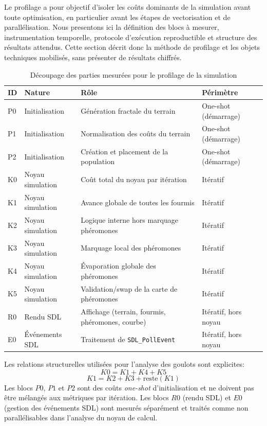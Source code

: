 \noindent
Le profilage a pour objectif d'isoler les coûts dominants de la simulation avant toute
optimisation, en particulier avant les étapes de vectorisation et de parallélisation.
Nous presentons ici la définition des
blocs à mesurer, instrumentation temporelle, protocole d'exécution reproductible et
structure des résultats attendus. Cette section décrit donc la méthode de profilage et les
objets techniques mobilisés, sans présenter de résultats chiffrés.

\begin{table}[H]
\centering
\caption{Découpage des parties mesurées pour le profilage de la simulation}
\begin{tabularx}{\textwidth}{@{}l l X l@{}}
\toprule
\textbf{ID} & \textbf{Nature} & \textbf{Rôle} & \textbf{Périmètre} \\
\midrule
P0 & Initialisation & Génération fractale du terrain & One-shot (démarrage) \\
P1 & Initialisation & Normalisation des coûts du terrain & One-shot (démarrage) \\
P2 & Initialisation & Création et placement de la population & One-shot (démarrage) \\
K0 & Noyau simulation & Coût total du noyau par itération & Itératif \\
K1 & Noyau simulation & Avance globale de toutes les fourmis & Itératif \\
K2 & Noyau simulation & Logique interne hors marquage phéromones & Itératif \\
K3 & Noyau simulation & Marquage local des phéromones & Itératif \\
K4 & Noyau simulation & Évaporation globale des phéromones & Itératif \\
K5 & Noyau simulation & Validation/swap de la carte de phéromones & Itératif \\
R0 & Rendu SDL & Affichage (terrain, fourmis, phéromones, courbe) & Itératif, hors noyau \\
E0 & Événements SDL & Traitement de \texttt{SDL\_PollEvent} & Itératif, hors noyau \\
\bottomrule
\end{tabularx}
\end{table}

\noindent
Les relations structurelles utilisées pour l'analyse des goulots sont explicites:
\[
K0 = K1 + K4 + K5
\]
\[
K1 = K2 + K3 + \text{reste}(K1)
\]
Les blocs \(P0\), \(P1\) et \(P2\) sont des coûts \textit{one-shot} d'initialisation et ne doivent
pas être mélangés aux métriques par itération. Les blocs \(R0\) (rendu SDL) et \(E0\)
(gestion des événements SDL) sont mesurés séparément et traités comme non parallélisables
dans l'analyse du noyau de calcul.

